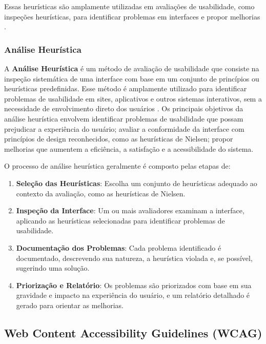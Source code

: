 {Essas heurísticas são amplamente utilizadas em avaliações de usabilidade, como inspeções heurísticas, para identificar problemas em interfaces e propor melhorias \citep{Nielsen1994}.

\subsubsection{Análise Heurística}
A \textbf{Análise Heurística} é um método de avaliação de usabilidade que consiste na inspeção sistemática de uma interface com base em um conjunto de princípios ou heurísticas predefinidas. Esse método é amplamente utilizado para identificar problemas de usabilidade em sites, aplicativos e outros sistemas interativos, sem a necessidade de envolvimento direto dos usuários \citep{Nielsen1994}.
Os principais objetivos da análise heurística envolvem identificar problemas de usabilidade que possam prejudicar a experiência do usuário; avaliar a conformidade da interface com princípios de design reconhecidos, como as heurísticas de Nielsen; propor melhorias que aumentem a eficiência, a satisfação e a acessibilidade do sistema.

O processo de análise heurística geralmente é composto pelas etapas de:

\begin{enumerate}
    \item \textbf{Seleção das Heurísticas}: Escolha um conjunto de heurísticas adequado ao contexto da avaliação, como as heurísticas de Nielsen.
    
    \item \textbf{Inspeção da Interface}: Um ou mais avaliadores examinam a interface, aplicando as heurísticas selecionadas para identificar problemas de usabilidade.
    
    \item \textbf{Documentação dos Problemas}: Cada problema identificado é documentado, descrevendo sua natureza, a heurística violada e, se possível, sugerindo uma solução.
    
    \item \textbf{Priorização e Relatório}: Os problemas são priorizados com base em sua gravidade e impacto na experiência do usuário, e um relatório detalhado é gerado para orientar as melhorias.
\end{enumerate}

\subsection{Web Content Accessibility Guidelines (WCAG)}

}
